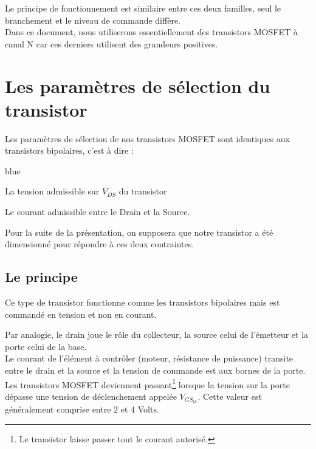      Le principe de fonctionnement est similaire entre ces deux familles, seul le branchement et le niveau de commande diffère.\\
     Dans ce document, nous utiliserons essentiellement des transistors MOSFET à canal N car ces derniers utilisent des grandeurs 
     positives.
     

     \section{Les paramètres de sélection du transistor}
     
     Les paramètres de sélection de nos transistors MOSFET sont identiques aux transistors bipolaires, c'est à dire :
     
     \begin{items}{blue}{\Triangle}
     
       \item La tension admissible sur $V_{DS}$ du transistor
       \item Le courant admissible entre le Drain et la Source.
     \end{items}
     
     Pour la suite de la présentation, on supposera que notre transistor a été dimensionné pour répondre à ces deux contraintes.


     \subsection{Le principe}

     Ce type de transistor fonctionne comme les transistors bipolaires mais est commandé en tension et non en courant.

     Par analogie, le drain joue le rôle du collecteur, la source celui de l'émetteur et la porte celui de la base.\\
     Le courant de l'élément à contrôler (moteur, résistance de puissance) transite entre le drain et la source et la tension de commande est aux bornes de la porte.\\
     
     Les transistors MOSFET deviennent passant\footnote{Le transistor laisse passer tout le courant autorisé.} lorsque la tension sur la porte dépasse une tension de déclenchement appelée $V_{GS_{th}}$.
     Cette valeur est généralement comprise entre $2$ et $4$ Volts.\\

